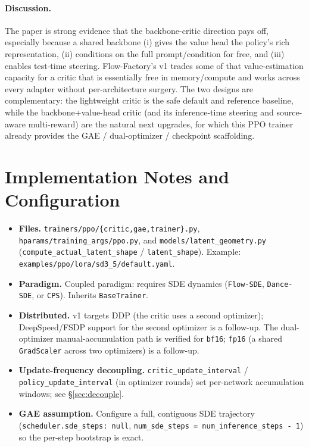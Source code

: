 \documentclass[11pt]{article}
\theoremstyle{plain}
\theoremstyle{remark}
\begin{document}
\paragraph{Discussion.}
The paper is strong evidence that the backbone-critic direction pays off, especially
because a shared backbone (i) gives the value head the policy's rich representation,
(ii) conditions on the full prompt/condition for free, and (iii) enables test-time
steering. Flow-Factory's v1 trades some of that value-estimation capacity for a critic
that is essentially free in memory/compute and works across every adapter without
per-architecture surgery. The two designs are complementary: the lightweight critic
is the safe default and reference baseline, while the backbone+value-head critic (and
its inference-time steering and source-aware multi-reward) are the natural next
upgrades, for which this PPO trainer already provides the GAE / dual-optimizer /
checkpoint scaffolding.

\section{Implementation Notes and Configuration}
\label{sec:impl}

\begin{itemize}[leftmargin=1.4em]
  \item \textbf{Files.} \texttt{trainers/ppo/\{critic,gae,trainer\}.py},
  \texttt{hparams/training\_args/ppo.py}, and
  \texttt{models/latent\_geometry.py} (\texttt{compute\_actual\_latent\_shape} /
  \texttt{latent\_shape}). Example: \texttt{examples/ppo/lora/sd3\_5/default.yaml}.
  \item \textbf{Paradigm.} Coupled paradigm: requires SDE dynamics
  (\texttt{Flow-SDE}, \texttt{Dance-SDE}, or \texttt{CPS}). Inherits \texttt{BaseTrainer}.
  \item \textbf{Distributed.} v1 targets DDP (the critic uses a second optimizer);
  DeepSpeed/FSDP support for the second optimizer is a follow-up. The dual-optimizer
  manual-accumulation path is verified for \texttt{bf16}; \texttt{fp16} (a shared
  \texttt{GradScaler} across two optimizers) is a follow-up.
  \item \textbf{Update-frequency decoupling.} \texttt{critic\_update\_interval} /
  \texttt{policy\_update\_interval} (in optimizer rounds) set per-network
  accumulation windows; see \S\ref{sec:decouple}.
  \item \textbf{GAE assumption.} Configure a full, contiguous SDE trajectory
  (\texttt{scheduler.sde\_steps: null}, \texttt{num\_sde\_steps = num\_inference\_steps - 1})
  so the per-step bootstrap is exact.
\end{itemize}
\end{document}
